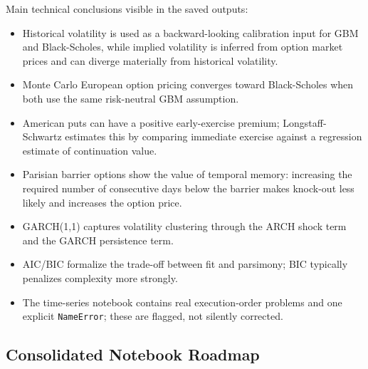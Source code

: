 \documentclass[
  11pt,
]{article}
\providecommand{\tightlist}{%
  \setlength{\itemsep}{0pt}\setlength{\parskip}{0pt}}
\begin{document}
Main technical conclusions visible in the saved outputs:

\begin{itemize}
\tightlist
\item
  Historical volatility is used as a backward-looking calibration input for GBM and Black-Scholes, while implied volatility is inferred from option market prices and can diverge materially from historical volatility.
\item
  Monte Carlo European option pricing converges toward Black-Scholes when both use the same risk-neutral GBM assumption.
\item
  American puts can have a positive early-exercise premium; Longstaff-Schwartz estimates this by comparing immediate exercise against a regression estimate of continuation value.
\item
  Parisian barrier options show the value of temporal memory: increasing the required number of consecutive days below the barrier makes knock-out less likely and increases the option price.
\item
  GARCH(1,1) captures volatility clustering through the ARCH shock term and the GARCH persistence term.
\item
  AIC/BIC formalize the trade-off between fit and parsimony; BIC typically penalizes complexity more strongly.
\item
  The time-series notebook contains real execution-order problems and one explicit \texttt{NameError}; these are flagged, not silently corrected.
\end{itemize}

\subsection{Consolidated Notebook Roadmap}\label{consolidated-notebook-roadmap}
\end{document}
